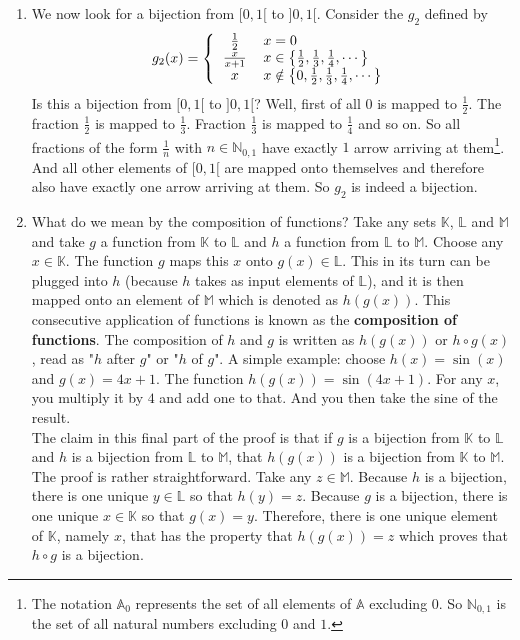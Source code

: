 \begin{enumerate}[i]
\item We now look for a bijection from $[0,1[$ to $]0,1[$. Consider the $g_2$ defined by
\begin{eqnarray*}
g_2 (x) = \left\{
\begin{tabular}{cl}
$\frac{1}{2}$ & $x=0$ \\
$\frac{x}{x+1}$ & $x \in \left\{ \frac{1}{2}, \frac{1}{3}, \frac{1}{4}, \cdots \right\}$ \\
$x$ & $x \notin \left\{0, \frac{1}{2}, \frac{1}{3}, \frac{1}{4}, \cdots \right\}$
\end{tabular}
\right.
\end{eqnarray*}
\noindent Is this a bijection from $[0,1[$ to $]0,1[$? Well, first of all $0$ is mapped to $\frac{1}{2}$. The fraction $\frac{1}{2}$ is mapped to $\frac{1}{3}$. Fraction $\frac{1}{3}$ is mapped to $\frac{1}{4}$ and so on. So all fractions of the form $\frac{1}{n}$ with $n \in \mathbb{N}_{0,1}$ have exactly $1$ arrow arriving at them\footnote{The notation $\mathbb{A}_0$ represents the set of all elements of $\mathbb{A}$ excluding $0$. So $\mathbb{N}_{0,1}$ is the set of all natural numbers excluding $0$ and $1$.}. And all other elements of $[0,1[$ are mapped onto themselves and therefore also have exactly one arrow arriving at them. So $g_2$ is indeed a bijection.
\item  What do we mean by the composition of functions? Take any sets $\mathbb{K}$, $\mathbb{L}$ and $\mathbb{M}$ and take $g$ a function from $\mathbb{K}$ to $\mathbb{L}$ and $h$ a function from $\mathbb{L}$ to $\mathbb{M}$. Choose any $x \in \mathbb{K}$. The function $g$ maps this $x$ onto $g(x) \in \mathbb{L}$. This in its turn can be plugged into $h$ (because $h$ takes as input elements of $\mathbb{L}$), and it is then mapped onto an element of $\mathbb{M}$ which is denoted as $h \left( g\left( x \right) \right)$. This consecutive application of functions is known as the \textbf{composition of functions}. The composition of $h$ and $g$ is written as $h \left( g\left( x \right) \right)$ or $h\circ g(x)$, read as "$h$ after $g$" or "$h$ of $g$". A simple example: choose $h(x)= \sin (x)$ and $g(x) = 4x+1$. The function $h\left(g(x)\right)= \sin \left( 4x+1 \right)$. For any $x$, you multiply it by $4$ and add one to that. And you then take the sine of the result.\\

\noindent The claim in this final part of the proof is that if $g$ is a bijection from $\mathbb{K}$ to $\mathbb{L}$ and $h$ is a bijection from $\mathbb{L}$ to $\mathbb{M}$, that $h\left( g\left( x \right) \right)$ is a bijection from $\mathbb{K}$ to $\mathbb{M}$. The proof is rather straightforward. Take any $z \in \mathbb{M}$. Because $h$ is a bijection, there is one unique $y \in \mathbb{L}$ so that $h(y) = z$. Because $g$ is a bijection, there is one unique $x \in \mathbb{K}$ so that $g(x) = y$. Therefore, there is one unique element of $\mathbb{K}$, namely $x$, that has the property that $h(g(x))=z$ which proves that $h\circ g$ is a bijection.\\


\end{enumerate}
